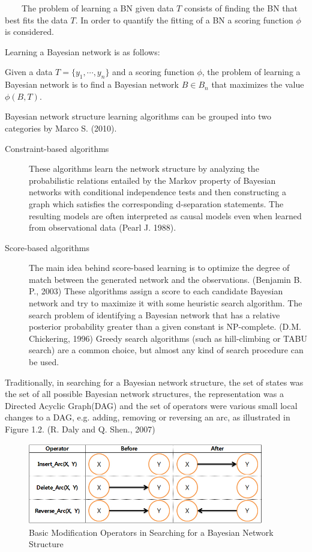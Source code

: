 ~~~~The problem of learning a BN given data $T$ consists of finding the BN that best fits the data $T$. In order to quantify the fitting of a BN a scoring function $\phi$ is considered.

Learning a Bayesian network is as follows:

Given a data $T = \{y_{1}, \cdots, y_{n}\}$ and a scoring function $\phi$, the problem of learning a Bayesian network is to find a Bayesian network $B \in B_{n}$ that maximizes the value $\phi(B, T)$.

Bayesian network structure learning algorithms can be grouped into two categories by Marco S. (2010).

\begin{description}

	\item[Constraint-based algorithms] These algorithms learn the network structure by analyzing the probabilistic relations entailed by the Markov property of Bayesian networks with conditional independence tests and then constructing a graph which satisfies the corresponding d-separation statements. The resulting models are often interpreted as causal models even when learned from observational data (Pearl J. 1988).
	
	\item[Score-based algorithms] The main idea behind score-based learning is to optimize the degree of match between the generated network and the observations. (Benjamin B. P., 2003) These algorithms assign a score to each candidate Bayesian network and try to maximize it with some heuristic search algorithm. The search problem of identifying a Bayesian network that has a relative posterior probability greater than a given constant is NP-complete. (D.M. Chickering, 1996) Greedy search algorithms (such as hill-climbing or TABU search) are a common choice, but almost any kind of search procedure can be used.
\end{description}

Traditionally, in searching for a Bayesian network structure, the set of states was the set of all possible Bayesian network structures, the representation was a Directed Acyclic Graph(DAG) and the set of operators were various small local changes to a DAG, e.g. adding, removing or reversing an arc, as illustrated in Figure 1.2. (R. Daly and Q. Shen., 2007)

\begin{figure}[!h]
	\centering
		\includegraphics[height=100pt]{DAG_Operators}
		\caption{Basic Modification Operators in Searching for a Bayesian Network Structure}
\end{figure}	
